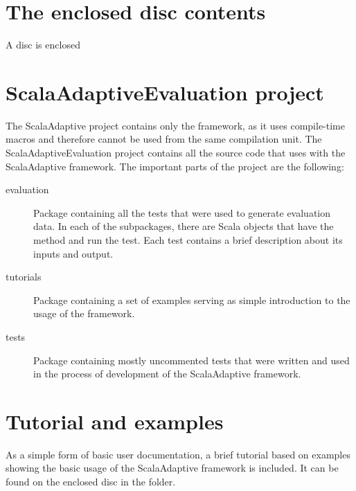 \documentclass[12pt,a4paper]{report}
\begin{document}
\label{attachments}
\renewcommand{\thesection}{\Alph{section}}

\section{The enclosed disc contents}
\label{attach:cd}

A disc is enclosed 

\section{ScalaAdaptiveEvaluation project}
\label{attach:eval_project}

The ScalaAdaptive project contains only the framework, as it uses compile-time macros and therefore cannot be used from the same compilation unit. The ScalaAdaptiveEvaluation project contains all the source code that uses with the ScalaAdaptive framework. The important parts of the project are the following:

\begin{description}
	\item [evaluation] Package containing all the tests that were used to generate evaluation data. In each of the subpackages, there are Scala objects that have the  method and run the test. Each test contains a brief description about its inputs and output.
	\item [tutorials] Package containing a set of examples serving as simple introduction to the usage of the framework.
	\item [tests] Package containing mostly uncommented tests that were written and used in the process of development of the ScalaAdaptive framework.
\end{description}

\section{Tutorial and examples}
\label{attach:tutorial}
As a simple form of basic user documentation, a brief tutorial based on examples showing the basic usage of the ScalaAdaptive framework is included. It can be found on the enclosed disc in the  folder.
\end{document}
